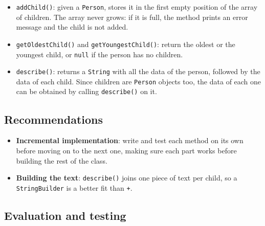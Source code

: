 \begin{itemize}
\begin{itemize}
\begin{itemize}
                    \item A constructor that receives only \texttt{name}, \texttt{age}, \texttt{height}, \texttt{weight} and \texttt{address}, for a person without children. The array of children must be created anyway, with no positions, never left as \texttt{null}.

                \end{itemize}

            \item \texttt{addChild()}: given a \texttt{Person}, stores it in the first empty position of the array of children. The array never grows: if it is full, the method prints an error message and the child is not added.

            \item \texttt{getOldestChild()} and \texttt{getYoungestChild()}: return the oldest or the youngest child, or \texttt{null} if the person has no children.

            \item \texttt{describe()}: returns a \texttt{String} with all the data of the person, followed by the data of each child. Since children are \texttt{Person} objects too, the data of each one can be obtained by calling \texttt{describe()} on it.

        \end{itemize}

\end{itemize}

\subsection{Recommendations}

\begin{itemize}

    \item \textbf{Incremental implementation}: write and test each method on its own before moving on to the next one, making sure each part works before building the rest of the class.

    \item \textbf{Building the text}: \texttt{describe()} joins one piece of text per child, so a \texttt{StringBuilder} is a better fit than \texttt{+}.

\end{itemize}

\subsection{Evaluation and testing}

